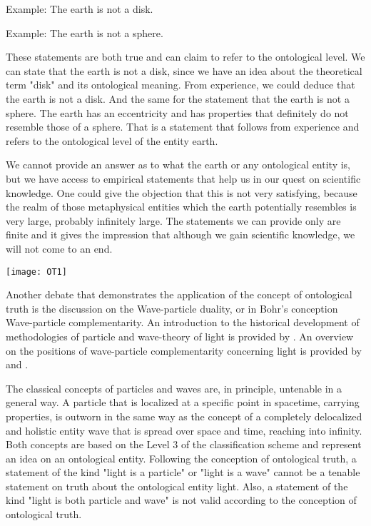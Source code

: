 \documentclass{article}
\begin{document}
Example: The earth is not a disk. \newline

Example: The earth is not a sphere. \newline

These statements are both true and can claim to refer to the ontological level. We can state that the earth is not a disk, since we have an idea about the theoretical term "disk" and its ontological meaning. From experience, we could deduce that the earth is not a disk. And the same for the statement that the earth is not a sphere. The earth has an eccentricity and has properties that definitely do not resemble those of a sphere. That is a statement that follows from experience and refers to the ontological level of the entity earth. \newline

We cannot provide an answer as to what the earth or any ontological entity is, but we have access to empirical statements that help us in our quest on scientific knowledge. One could give the objection that this is not very satisfying, because the realm of those metaphysical entities which the earth potentially resembles is very large, probably infinitely large. The statements we can provide only are finite and it gives the impression that although we gain scientific knowledge, we will not come to an end. 

\begin{minipage}{\textwidth}
\centering
\texttt{[image: OT1]}
\end{minipage}
\bigskip


Another debate that demonstrates the application of the concept of ontological truth is the discussion on the Wave-particle duality, or in Bohr's conception Wave-particle complementarity. An introduction to the historical development of methodologies of particle and wave-theory of light is provided by \cite[]{achinstein1991particles}. An overview on the positions of wave-particle complementarity concerning light is provided by \cite[]{rauchcombourieu1992wave} and \cite[]{ghose1996two}. \newline

The classical concepts of particles and waves are, in principle, untenable in a general way. A particle that is localized at a specific point in spacetime, carrying properties, is outworn in the same way as the concept of a completely delocalized and holistic entity wave that is spread over space and time, reaching into infinity. Both concepts are based on the Level 3 of the classification scheme and represent an idea on an ontological entity. Following the conception of ontological truth, a statement of the kind "light is a particle" or "light is a wave" cannot be a tenable statement on truth about the ontological entity light. Also, a statement of the kind "light is both particle and wave" is not valid according to the conception of ontological truth. \newline
\end{document}
